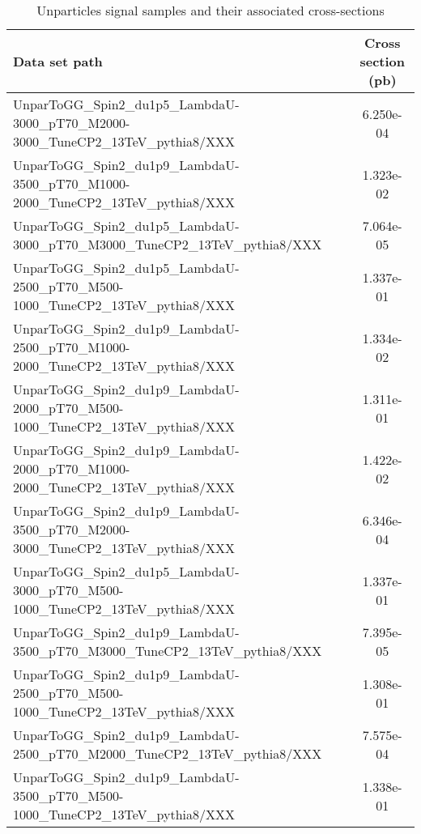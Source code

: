 \begin{landscape}
\begin{table}[!htbp]
\begin{tabular}{lc}
       \hline \hline
       \end{tabular}
       \label{table:Unparticles_signal_samples_xsec_p2}
\end{table}
\end{landscape}



\begin{landscape}
\begin{table}[!htbp]
       \caption{ Unparticles signal samples and their associated cross-sections }
       \centering
       \vspace{\baselineskip}
       \begin{tabular}{lc}
       \hline \hline
       Data set path & Cross section (pb)\\
       \hline

       UnparToGG\_Spin2\_du1p5\_LambdaU-3000\_pT70\_M2000-3000\_TuneCP2\_13TeV\_pythia8/XXX & 6.250e-04\\
       UnparToGG\_Spin2\_du1p9\_LambdaU-3500\_pT70\_M1000-2000\_TuneCP2\_13TeV\_pythia8/XXX & 1.323e-02\\
       UnparToGG\_Spin2\_du1p5\_LambdaU-3000\_pT70\_M3000\_TuneCP2\_13TeV\_pythia8/XXX & 7.064e-05\\
       UnparToGG\_Spin2\_du1p5\_LambdaU-2500\_pT70\_M500-1000\_TuneCP2\_13TeV\_pythia8/XXX & 1.337e-01\\
       UnparToGG\_Spin2\_du1p9\_LambdaU-2500\_pT70\_M1000-2000\_TuneCP2\_13TeV\_pythia8/XXX & 1.334e-02\\
       UnparToGG\_Spin2\_du1p9\_LambdaU-2000\_pT70\_M500-1000\_TuneCP2\_13TeV\_pythia8/XXX & 1.311e-01\\
       UnparToGG\_Spin2\_du1p9\_LambdaU-2000\_pT70\_M1000-2000\_TuneCP2\_13TeV\_pythia8/XXX & 1.422e-02\\
       UnparToGG\_Spin2\_du1p9\_LambdaU-3500\_pT70\_M2000-3000\_TuneCP2\_13TeV\_pythia8/XXX & 6.346e-04\\
       UnparToGG\_Spin2\_du1p5\_LambdaU-3000\_pT70\_M500-1000\_TuneCP2\_13TeV\_pythia8/XXX & 1.337e-01\\
       UnparToGG\_Spin2\_du1p9\_LambdaU-3500\_pT70\_M3000\_TuneCP2\_13TeV\_pythia8/XXX & 7.395e-05\\
       UnparToGG\_Spin2\_du1p9\_LambdaU-2500\_pT70\_M500-1000\_TuneCP2\_13TeV\_pythia8/XXX & 1.308e-01\\
       UnparToGG\_Spin2\_du1p9\_LambdaU-2500\_pT70\_M2000\_TuneCP2\_13TeV\_pythia8/XXX & 7.575e-04\\
       UnparToGG\_Spin2\_du1p9\_LambdaU-3500\_pT70\_M500-1000\_TuneCP2\_13TeV\_pythia8/XXX & 1.338e-01\\

       \hline \hline
       \end{tabular}
       \label{table:Unparticles_signal_samples_xsec_p2}
\end{table}
\end{landscape}
